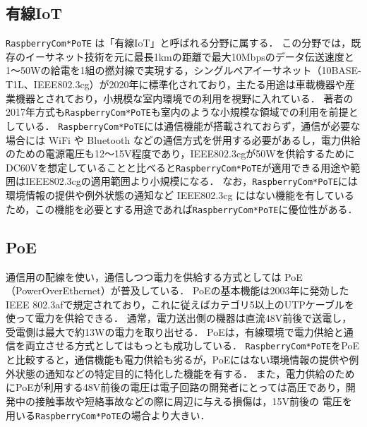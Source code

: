 
\subsection{有線IoT}

{\tt Raspberry\-Com*PoTE} は「有線IoT」と呼ばれる分野に属する．
この分野では，既存のイーサネット技術を元に最長1kmの距離で最大10Mbpsのデータ伝送速度と1〜50Wの給電を1組の撚対線で実現する，シングルペアイーサネット（10BASE-T1L、IEEE802.3cg）が2020年に標準化されており，主たる用途は車載機器や産業機器とされており，小規模な室内環境での利用を視野に入れている．
著者の 2017年方式も{\tt Raspberry\-Com*PoTE}も室内のような小規模な領域での利用を前提としている．
{\tt Raspberry\-Com*PoTE}には通信機能が搭載されておらず，通信が必要な場合には WiFi や Bluetooth などの通信方式を併用する必要があるし，電力供給のための電源電圧も12〜15V程度であり，IEEE802.3cgが50Wを供給するためにDC60Vを想定していることと比べると{\tt Raspberry\-Com*PoTE}が適用できる用途や範囲はIEEE802.3cgの適用範囲より小規模になる．
なお，{\tt Raspberry\-Com*PoTE}には環境情報の提供や例外状態の通知など IEEE802.3cg にはない機能を有しているため，この機能を必要とする用途であれば{\tt Raspberry\-Com*PoTE}に優位性がある．




\subsection{PoE}

通信用の配線を使い，通信しつつ電力を供給する方式としては PoE（PowerOverEthernet）が普及している．
PoEの基本機能は2003年に発効したIEEE 802.3afで規定されており，これに従えばカテゴリ5以上のUTPケーブルを使って電力を供給できる．
通常，電力送出側の機器は直流48V前後で送電し，受電側は最大で約13Wの電力を取り出せる．
PoEは，有線環境で電力供給と通信を両立させる方式としてはもっとも成功している．
{\tt Raspberry\-Com*PoTE}をPoEと比較すると，通信機能も電力供給も劣るが，PoEにはない環境情報の提供や例外状態の通知などの特定目的に特化した機能を有する．
また，電力供給のためにPoEが利用する48V前後の電圧は電子回路の開発者にとっては高圧であり，開発中の接触事故や短絡事故などの際に周辺に与える損傷は，15V前後の
電圧を用いる{\tt Raspberry\-Com*PoTE}の場合より大きい．

